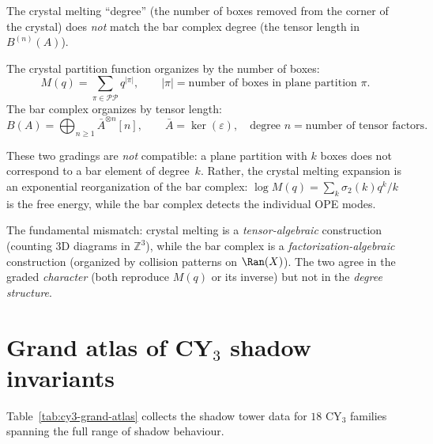 \begin{remark}[Combinatorial degree \texorpdfstring{$\neq$}{!=} bar degree]
\label{rem:crystal-bar-degree}
The crystal melting ``degree'' (the number of boxes removed from the corner of the crystal) does \emph{not} match the bar complex degree (the tensor length in $B^{(n)}(A)$).

The crystal partition function organizes by the number of boxes:
\[
 M(q) = \sum_{\pi \in \mathcal{PP}} q^{|\pi|}, \qquad |\pi| = \text{number of boxes in plane partition } \pi.
\]
The bar complex organizes by tensor length:
\[
 B(A) = \bigoplus_{n \geq 1} \bar{A}^{\otimes n}[n], \qquad \bar{A}=\ker(\varepsilon),\quad \text{degree } n = \text{number of tensor factors}.
\]

These two gradings are \emph{not} compatible: a plane partition with $k$ boxes does not correspond to a bar element of degree~$k$. Rather, the crystal melting expansion is an exponential reorganization of the bar complex: $\log M(q) = \sum_k \sigma_2(k) q^k / k$ is the free energy, while the bar complex detects the individual OPE modes.

The fundamental mismatch: crystal melting is a \emph{tensor-algebraic} construction (counting 3D diagrams in $\mathbb{Z}^3$), while the bar complex is a \emph{factorization-algebraic} construction (organized by collision patterns on $\Ran(X)$). The two agree in the graded \emph{character} (both reproduce $M(q)$ or its inverse) but not in the \emph{degree structure}.
\end{remark}


\section{Grand atlas of CY\texorpdfstring{$_3$}{-3} shadow invariants}
\label{sec:grand-atlas}

Table~\ref{tab:cy3-grand-atlas} collects the shadow tower data for $18$ CY$_3$ families spanning the full range of shadow behaviour.

